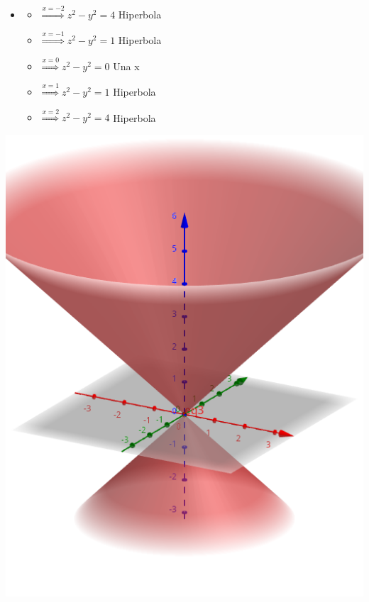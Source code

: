 \documentclass[../practica_02.tex]{subfiles}
\begin{document}
\begin{enumerate}
\begin{enumerate}
\begin{itemize}
                        \item
                            \begin{itemize}
                                \item $\stackrel{x=-2}{\Rightarrow} z^2 - y^2 = 4 $ Hiperbola
                                \item $\stackrel{x=-1}{\Rightarrow} z^2 - y^2 = 1 $ Hiperbola
                                \item $\stackrel{x=0}{\Rightarrow}  z^2 - y^2 = 0 $ Una x
                                \item $\stackrel{x=1}{\Rightarrow}  z^2 - y^2 = 1 $ Hiperbola
                                \item $\stackrel{x=2}{\Rightarrow}  z^2 - y^2 = 4 $ Hiperbola
                            \end{itemize}

                    \end{itemize}

                    \includegraphics[scale=0.4]{ej07/resources/1d.png} $ $


\end{enumerate}
\end{enumerate}
\end{document}
